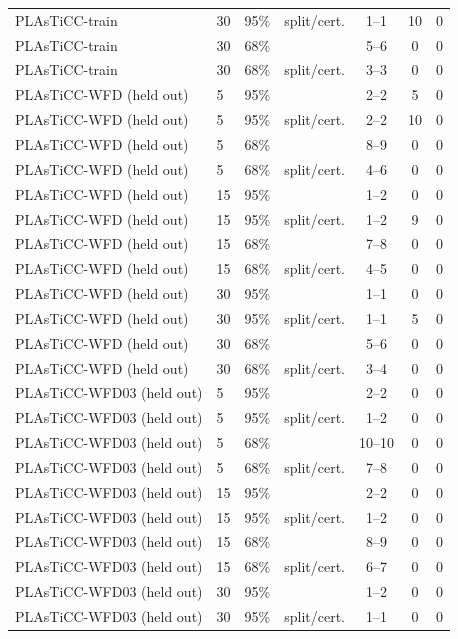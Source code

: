 \begin{longtable}{llllccc}
PLAsTiCC-train & 30 & 95\% & split/cert. & 1--1 & 10 & 0 \\
PLAsTiCC-train & 30 & 68\% & \gamut{} & 5--6 & 0 & 0 \\
PLAsTiCC-train & 30 & 68\% & split/cert. & 3--3 & 0 & 0 \\
PLAsTiCC-WFD (held out) & 5 & 95\% & \gamut{} & 2--2 & 5 & 0 \\
PLAsTiCC-WFD (held out) & 5 & 95\% & split/cert. & 2--2 & 10 & 0 \\
PLAsTiCC-WFD (held out) & 5 & 68\% & \gamut{} & 8--9 & 0 & 0 \\
PLAsTiCC-WFD (held out) & 5 & 68\% & split/cert. & 4--6 & 0 & 0 \\
PLAsTiCC-WFD (held out) & 15 & 95\% & \gamut{} & 1--2 & 0 & 0 \\
PLAsTiCC-WFD (held out) & 15 & 95\% & split/cert. & 1--2 & 9 & 0 \\
PLAsTiCC-WFD (held out) & 15 & 68\% & \gamut{} & 7--8 & 0 & 0 \\
PLAsTiCC-WFD (held out) & 15 & 68\% & split/cert. & 4--5 & 0 & 0 \\
PLAsTiCC-WFD (held out) & 30 & 95\% & \gamut{} & 1--1 & 0 & 0 \\
PLAsTiCC-WFD (held out) & 30 & 95\% & split/cert. & 1--1 & 5 & 0 \\
PLAsTiCC-WFD (held out) & 30 & 68\% & \gamut{} & 5--6 & 0 & 0 \\
PLAsTiCC-WFD (held out) & 30 & 68\% & split/cert. & 3--4 & 0 & 0 \\
PLAsTiCC-WFD03 (held out) & 5 & 95\% & \gamut{} & 2--2 & 0 & 0 \\
PLAsTiCC-WFD03 (held out) & 5 & 95\% & split/cert. & 1--2 & 0 & 0 \\
PLAsTiCC-WFD03 (held out) & 5 & 68\% & \gamut{} & 10--10 & 0 & 0 \\
PLAsTiCC-WFD03 (held out) & 5 & 68\% & split/cert. & 7--8 & 0 & 0 \\
PLAsTiCC-WFD03 (held out) & 15 & 95\% & \gamut{} & 2--2 & 0 & 0 \\
PLAsTiCC-WFD03 (held out) & 15 & 95\% & split/cert. & 1--2 & 0 & 0 \\
PLAsTiCC-WFD03 (held out) & 15 & 68\% & \gamut{} & 8--9 & 0 & 0 \\
PLAsTiCC-WFD03 (held out) & 15 & 68\% & split/cert. & 6--7 & 0 & 0 \\
PLAsTiCC-WFD03 (held out) & 30 & 95\% & \gamut{} & 1--2 & 0 & 0 \\
PLAsTiCC-WFD03 (held out) & 30 & 95\% & split/cert. & 1--1 & 0 & 0 \\

\end{longtable}
